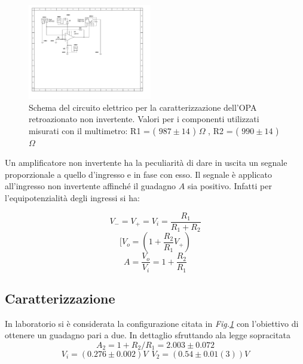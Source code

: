 \documentclass[journal]{IEEEtran}
\begin{document}
\begin{figure}[H]%
\begin {center}
\includegraphics[width=0.48\textwidth]{sch-simulations/output/OPA-closed-loop-non-inverting.pdf}
\caption{Schema del circuito elettrico per la caratterizzazione dell'OPA retroazionato non invertente. Valori per i componenti utilizzati misurati con il multimetro: R1 = ( $987 \pm 14$ ) $\Omega$ , R2 = ( $990 \pm 14$ ) $\Omega$
\\}
\label{fig:loop-non-inv}
\end {center}
\end{figure}

Un amplificatore non invertente ha la peculiarità di dare in uscita un segnale proporzionale a quello d'ingresso e in fase con esso. Il segnale è applicato all'ingresso non invertente affinché il guadagno $A$ sia positivo. Infatti per l'equipotenzialità degli ingressi si ha: 

\vspace{-3mm}

\begin{equation}
    V_{-} = V_{+} = V_{i} = \frac{R_1}{R_1+R_2}
\end{equation}
\begin{equation}
    [V_{o}=(1+\frac{R_2}{R_1}V_{+})
\end{equation}
\begin{equation}
    A=\frac{V_{o}}{V_i}=1+\frac{R_2}{R_1}
\end{equation}
\vspace{-7mm}


\subsection{\textbf{Caratterizzazione}}
In laboratorio si è considerata la configurazione citata in \textit{Fig.\ref{fig:loop-non-inv}} con l'obiettivo di ottenere un guadagno pari a due. In dettaglio sfruttando ala legge sopracitata
\[A_2 = 1 + R_2/R_1 = 2.003 \pm 0.072\]
\[V_i = (0.276 \pm 0.002) V \: \: V_2 = (0.54 \pm 0.01(3)) V\]
\end{document}
